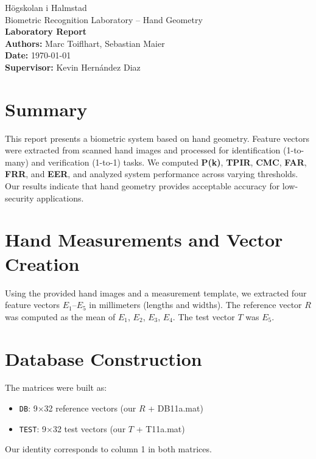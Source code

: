 \documentclass[a4paper,11pt]{article}
\begin{document}
\begin{titlepage}
    \centering
    {\Large Högskolan i Halmstad} \\[0.2cm]
    {\large Biometric Recognition Laboratory – Hand Geometry} \\[1cm]
    {\LARGE \textbf{Laboratory Report}} \\[1cm]
    \textbf{Authors:} Marc Toiflhart, Sebastian Maier \\
    \textbf{Date:} \today \\
    \textbf{Supervisor:} Kevin Hernández Diaz
    \vfill
\end{titlepage}

\section*{Summary}
This report presents a biometric system based on hand geometry. Feature vectors were extracted from scanned hand images and processed for identification (1-to-many) and verification (1-to-1) tasks. We computed \textbf{P(k)}, \textbf{TPIR}, \textbf{CMC}, \textbf{FAR}, \textbf{FRR}, and \textbf{EER}, and analyzed system performance across varying thresholds. Our results indicate that hand geometry provides acceptable accuracy for low-security applications.

\section{Hand Measurements and Vector Creation}
Using the provided hand images and a measurement template, we extracted four feature vectors $E_1$–$E_5$ in millimeters (lengths and widths). The reference vector $R$ was computed as the mean of $E_1$, $E_2$, $E_3$, $E_4$. The test vector $T$ was $E_5$.

\section{Database Construction}
The matrices were built as:
\begin{itemize}[noitemsep]
    \item \texttt{DB}: 9$\times$32 reference vectors (our $R$ + DB11a.mat)
    \item \texttt{TEST}: 9$\times$32 test vectors (our $T$ + T11a.mat)
\end{itemize}
Our identity corresponds to column 1 in both matrices.
\end{document}

